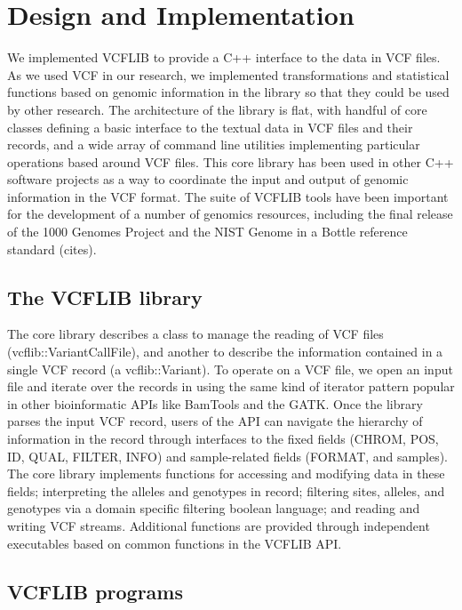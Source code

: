 \documentclass[10pt,letterpaper]{article}
\begin{document}
\section*{Design and Implementation}

We implemented VCFLIB to provide a C++ interface to the data in VCF files. As we used VCF in our research, we implemented transformations and statistical functions based on genomic information in the library so that they could be used by other research. The architecture of the library is flat, with handful of core classes defining a basic interface to the textual data in VCF files and their records, and a wide array of command line utilities implementing particular operations based around VCF files. This core library has been used in other C++ software projects as a way to coordinate the input and output of genomic information in the VCF format. The suite of VCFLIB tools have been important for the development of a number of genomics resources, including the final release of the 1000 Genomes Project and the NIST Genome in a Bottle reference standard (cites).

\subsection*{The VCFLIB library}

The core library describes a class to manage the reading of VCF files (vcflib::VariantCallFile), and another to describe the information contained in a single VCF record (a vcflib::Variant). To operate on a VCF file, we open an input file and iterate over the records in using the same kind of iterator pattern popular in other bioinformatic APIs like BamTools \cite{bamtools} and the GATK. Once the library parses the input VCF record, users of the API can navigate the hierarchy of information in the record through interfaces to the fixed fields (CHROM, POS, ID, QUAL, FILTER, INFO) and sample-related fields (FORMAT, and samples). The core library implements functions for accessing and modifying data in these fields; interpreting the alleles and genotypes in record; filtering sites, alleles, and genotypes via a domain specific filtering boolean language; and reading and writing VCF streams. Additional functions are provided through independent executables based on common functions in the VCFLIB API.

\subsection*{VCFLIB programs}
\end{document}
